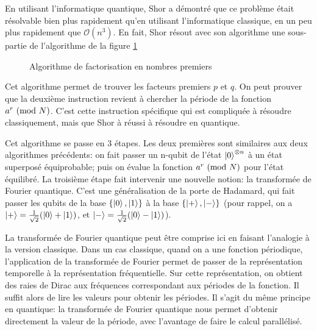 En utilisant l'informatique quantique, Shor a démontré que ce problème était résolvable bien plus rapidement qu'en utilisant l'informatique classique, en un peu plus rapidement que $\mathcal{O}(n^3)$. En fait, Shor résout avec son algorithme une sous-partie de l'algorithme de la figure \ref{fig:algoshor}

\pagebreak
\begin{figure}[h]
  

\begin{algorithm}[H]
  \SetAlgoLined
\end{algorithm}
\caption{Algorithme de factorisation en nombres premiers}
\label{fig:algoshor}
\end{figure}


Cet algorithme permet de trouver les facteurs premiers $p$ et $q$. On peut prouver que la deuxième instruction revient à chercher la période de la fonction $a^r \ (\mathrm{mod}\ N)$. C'est cette instruction spécifique qui est compliquée à résoudre classiquement, mais que Shor à réussi à résoudre en quantique.

Cet algorithme se passe en 3 étapes. Les deux premières sont similaires aux deux algorithmes précédents: on fait passer un n-qubit de l'état $\ket{0}^{\otimes n}$ à un état superposé équiprobable; puis on évalue la fonction $a^r \ (\mathrm{mod}\ N)$ pour l'état équilibré. La troisième étape fait intervenir une nouvelle notion: la transformée de Fourier quantique. C'est une généralisation de la porte de Hadamard, qui fait passer les qubits de la base $\{\ket{0}, \ket{1}\}$ à la base $\{\ket{+}, \ket{-}\}$ (pour rappel, on a $\ket{+} = \frac{1}{\sqrt{2}}(\ket{0} + \ket{1})$, et $\ket{-} = \frac{1}{\sqrt{2}}(\ket{0} - \ket{1})$).

La transformée de Fourier quantique peut être comprise ici en faisant l'analogie à la version classique. Dans un cas classique, quand on a une fonction périodique, l'application de la transformée de Fourier permet de passer de la représentation temporelle à la représentation fréquentielle. Sur cette représentation, on obtient des raies de Dirac aux fréquences correspondant aux périodes de la fonction. Il suffit alors de lire les valeurs pour obtenir les périodes. Il s'agit du même principe en quantique: la transformée de Fourier quantique nous permet d'obtenir directement la valeur de la période, avec l'avantage de faire le calcul parallélisé.

